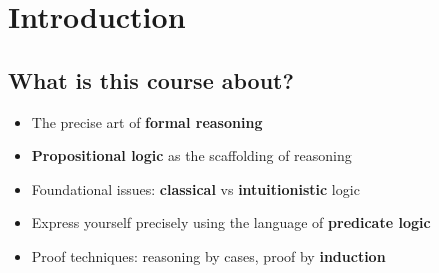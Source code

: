 \begin{coqdoccode}
\coqdocemptyline
\end{coqdoccode}
\chapter{Introduction} \begin{coqdoccode}
\coqdocemptyline
\end{coqdoccode}
\section{What is this course about?}

\begin{coqdoccode}
\coqdocemptyline
\end{coqdoccode}



\begin{itemize}
\item  The precise art of \textbf{formal reasoning}

\end{itemize}



\begin{itemize}
\item  \textbf{Propositional logic} as the scaffolding of reasoning

\end{itemize}



\begin{itemize}
\item  Foundational issues: \textbf{ classical} vs \textbf{intuitionistic} logic

\end{itemize}



\begin{itemize}
\item  Express yourself precisely
    using the language of \textbf{predicate logic}

\end{itemize}



\begin{itemize}
\item  Proof techniques: reasoning by cases, proof by \textbf{induction}

\end{itemize}




